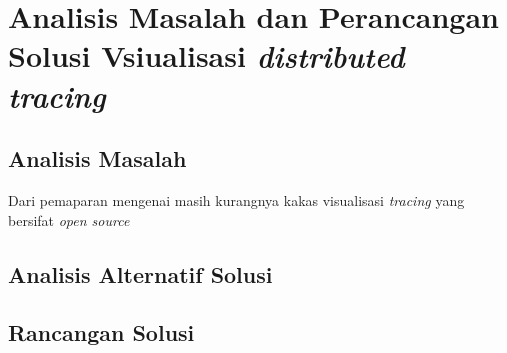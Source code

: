 \chapter{Analisis Masalah dan Perancangan Solusi Vsiualisasi \textit{distributed tracing}}



\section{Analisis Masalah}

Dari pemaparan mengenai masih kurangnya kakas visualisasi \textit{tracing} yang bersifat \textit{open source}



\section{Analisis Alternatif Solusi}

\section{Rancangan Solusi}


